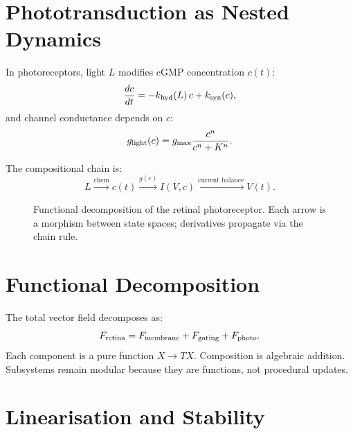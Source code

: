 \documentclass[12pt,openany]{book}
\begin{document}
\section{Phototransduction as Nested Dynamics}

In photoreceptors, light $L$ modifies cGMP concentration $c(t)$:
\[
  \frac{dc}{dt} = -k_{\rm hyd}(L)\,c + k_{\rm syn}(c),
\]
and channel conductance depends on $c$:
\[
  g_{\rm light}(c) = g_{\rm max}\frac{c^n}{c^n+K^n}.
\]

The compositional chain is:
\[
  L \xrightarrow{\text{chem}} c(t)
    \xrightarrow{g(c)} I(V,c)
    \xrightarrow{\text{current balance}} V(t).
\]

\begin{figure}[H]
\centering
{}
\caption{Functional decomposition of the retinal photoreceptor. Each arrow
is a morphism between state spaces; derivatives propagate via the chain rule.}
\label{fig:retina-chain}
\end{figure}

\section{Functional Decomposition}

The total vector field decomposes as:
\[
  F_{\rm retina} = F_{\rm membrane} + F_{\rm gating} + F_{\rm photo}.
\]
Each component is a pure function $X\to TX$. Composition is algebraic
addition. Subsystems remain modular because they are functions, not procedural
updates.

\section{Linearisation and Stability}
\end{document}
